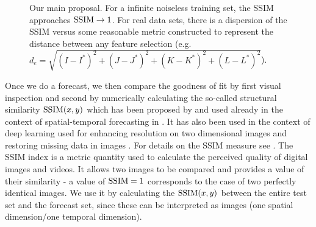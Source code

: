 \documentclass[journal]{IEEEtran}
\begin{document}
\begin{figure}[!htb]
\caption{Our main proposal. For a infinite noiseless training set, the SSIM approaches $\textnormal{SSIM} \to 1$. For real data sets,
there is a dispersion of the SSIM versus some reasonable metric constructed to
 represent the distance between any feature selection (e.g.\ $d_e = \sqrt{(I-I^*)^2+(J-J^*)^2+(K-K^*)^2+(L-L^*)^2}$).
}
\label{conjecture}
\end{figure}

Once we do a forecast, we then compare the goodness of fit by first visual inspection and second by numerically calculating the so-called
structural similarity $\textnormal{SSIM}(x,y)$ which has been proposed by \cite{Wang04imagequality} and used already in the context of spatial-temporal forecasting in \cite{covas2016, covaspeixinhojoao}. It has also been used in the context of deep learning used for enhancing
resolution on two dimensional images \cite{2015arXiv150100092D} and restoring missing data in images \cite{2018arXiv180208369Z}. For details on the SSIM measure see \cite{Wang04imagequality,2009ISPM...26...98W, 2012ITIP...21.1488B}.
The SSIM index is a metric quantity used to calculate the perceived quality of digital images and videos.  It
allows two images to be compared and provides a value of their similarity - a value of $\textnormal{SSIM}=1$ corresponds to the case of two
perfectly identical images. We use it by calculating the $\textnormal{SSIM}(x,y)$ between the entire test set and the forecast set,
since these can be interpreted as images (one spatial dimension/one temporal dimension).
\end{document}
